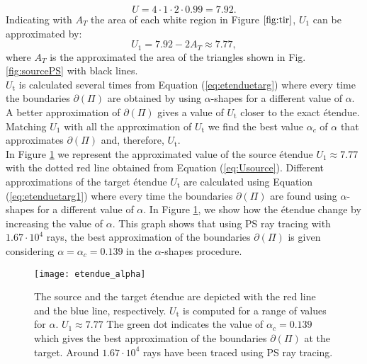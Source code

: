  \begin{equation}U = 4\cdot 1\cdot 2\cdot 0.99 = 7.92.\end{equation} Indicating with $A_{T}$ the area of each white region  in Figure $\ref{fig:tir}$, $U_1$ can be approximated by:
 \begin{equation}\label{eq:Usource}
 U_{1} = 7.92-2A_{T}\approx 7.77,
 \end{equation}
 where $A_{T}$ is the approximated the area of the triangles shown in Fig. \ref{fig:sourcePS} with black lines.\\ \indent  $U_{\textrm{t}}$ is calculated several times from Equation (\ref{eq:etenduetarg}) where every time the boundaries $\partial$$(\Pi)$ are obtained by using $\alpha$-shapes for a different value of $\alpha$. A better approximation of $\partial$$(\Pi)$ gives a value of $U_{\textrm{t}}$ closer to the exact \'{e}tendue. 
Matching $U_1$ with all the approximation of $U_{\textrm{t}}$ we find the best value $\alpha_c$ of $\alpha$ that approximates $\partial$$(\Pi)$ and, therefore, $U_{\textrm{t}}$. \\ \indent In Figure \ref{fig:etendueTS} we represent the approximated value of the source \'{e}tendue $U_1\approx 7.77$ with the dotted red line obtained from Equation (\ref{eq:Usource}). Different approximations of the target \'{e}tendue $U_{\textrm{t}}$ are calculated using Equation (\ref{eq:etenduetarg1}) where every time the boundaries $\partial$$(\Pi)$ are found using $\alpha$-shapes for a different value of $\alpha$. In Figure \ref{fig:etendueTS}, we show how the \'{e}tendue change by increasing the value of $\alpha$. This graph shows that using PS ray tracing with $1.67\cdot 10^4$ rays, the best approximation of the boundaries $\partial$$(\Pi)$ is given considering $\alpha = \alpha_c = 0.139$ in the $\alpha$-shapes procedure.
 \begin{figure}[h]
  \begin{center}
  \texttt{[image: etendue\_alpha]}
  \end{center}
  \caption{\footnotesize{The source and the target \'{e}tendue are depicted with the red line and the blue line, respectively.
  $U_\textrm{t}$ is computed for a range of values for $\alpha$. $U_1 \approx 7.77$
   The green dot indicates the value of $\alpha_c = 0.139$ which gives the best approximation of the boundaries $\partial$$(\Pi)$ at the target.
   Around $1.67 \cdot 10^4$ rays have been traced using PS ray tracing.
  }}
  \label{fig:etendueTS}
\end{figure}
